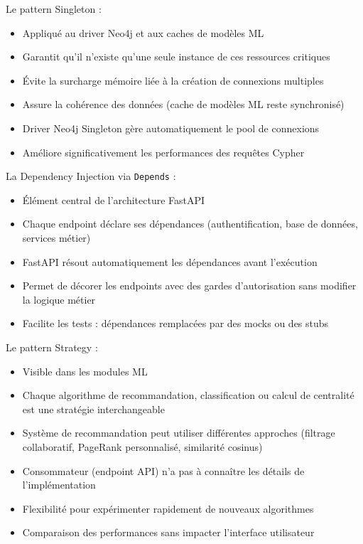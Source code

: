 \documentclass[12pt,a4paper]{report}
\begin{document}
Le pattern Singleton :
\begin{itemize}
  \item Appliqué au driver Neo4j et aux caches de modèles ML
  \item Garantit qu'il n'existe qu'une seule instance de ces ressources critiques
  \item Évite la surcharge mémoire liée à la création de connexions multiples
  \item Assure la cohérence des données (cache de modèles ML reste synchronisé)
  \item Driver Neo4j Singleton gère automatiquement le pool de connexions
  \item Améliore significativement les performances des requêtes Cypher
\end{itemize}

La Dependency Injection via \texttt{Depends} :
\begin{itemize}
  \item Élément central de l'architecture FastAPI
  \item Chaque endpoint déclare ses dépendances (authentification, base de données, services métier)
  \item FastAPI résout automatiquement les dépendances avant l'exécution
  \item Permet de décorer les endpoints avec des gardes d'autorisation sans modifier la logique métier
  \item Facilite les tests : dépendances remplacées par des mocks ou des stubs
\end{itemize}

Le pattern Strategy :
\begin{itemize}
  \item Visible dans les modules ML
  \item Chaque algorithme de recommandation, classification ou calcul de centralité est une stratégie interchangeable
  \item Système de recommandation peut utiliser différentes approches (filtrage collaboratif, PageRank personnalisé, similarité cosinus)
  \item Consommateur (endpoint API) n'a pas à connaître les détails de l'implémentation
  \item Flexibilité pour expérimenter rapidement de nouveaux algorithmes
  \item Comparaison des performances sans impacter l'interface utilisateur
\end{itemize}
\end{document}
